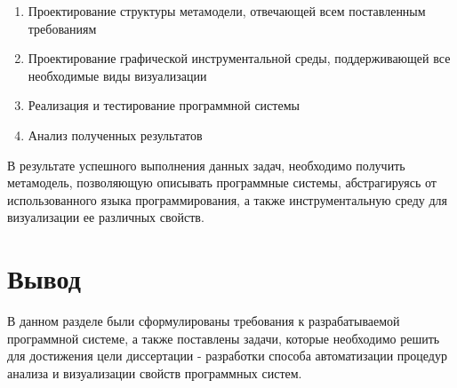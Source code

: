 \begin{enumerate}
    \item Проектирование структуры метамодели, отвечающей всем поставленным
    требованиям
    \item Проектирование графической инструментальной среды, поддерживающей все
    необходимые виды визуализации
    \item Реализация и тестирование программной системы
    \item Анализ полученных результатов
\end{enumerate}

В результате успешного выполнения данных задач, необходимо получить метамодель,
позволяющую описывать программные системы, абстрагируясь от использованного
языка программирования, а также инструментальную среду для визуализации ее
различных свойств.

\section{Вывод}

В данном разделе были сформулированы требования к разрабатываемой программной
системе, а также поставлены задачи, которые необходимо решить для достижения
цели диссертации - разработки способа автоматизации процедур анализа и
визуализации свойств программных систем.

